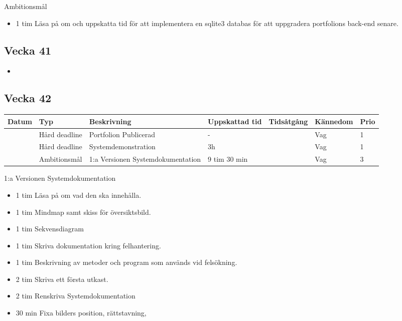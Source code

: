 \documentclass{TDP003mall}
\begin{document}
Ambitionsmål
\begin{itemize}
\item 1 tim Läsa på om och uppskatta tid för att implementera en sqlite3 databas för att uppgradera portfolions back-end senare.
  \end{itemize}

\subsection{Vecka 41}

\begin{itemize}
  \item
\end{itemize}


\subsection{Vecka 42}
\begin{tabularx}{\linewidth}{|l|l|X|l|l|l|l|}
	\hline
	Datum & Typ           & Beskrivning                       & Uppskattad tid & Tidsåtgång & Kännedom & Prio \\ [0.5ex]
	\hline                                             
          & Hård deadline & Portfolion Publicerad             & -              &            & Vag      & 1    \\
	\hline                                             
          & Hård deadline & Systemdemonstration               & 3h             &            & Vag      & 1    \\
	\hline                                             
          & Ambitionsmål  & 1:a Versionen Systemdokumentation & 9 tim 30 min             &            & Vag      & 3    \\
	\hline
\end{tabularx}

1:a Versionen Systemdokumentation\\
\begin{itemize}
  \item 1 tim Läsa på om vad den ska innehålla.
  \item 1 tim Mindmap samt skiss för översiktsbild.
  \item 1 tim Sekvensdiagram
  \item 1 tim Skriva dokumentation kring felhantering.
  \item 1 tim Beskrivning av metoder och program som används vid felsökning.
  \item 2 tim Skriva ett första utkast.
  \item 2 tim Renskriva Systemdokumentation
  \item 30 min Fixa bilders position, rättstavning, 
\end{itemize}
\end{document}
